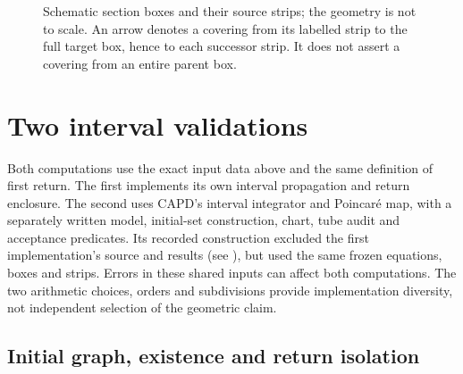 \begin{figure}[ht]
\centering
{}
\caption{Schematic section boxes and their source strips; the geometry is not
to scale. An arrow denotes a covering from its labelled strip to the full
target box, hence to each successor strip. It does not assert a covering
from an entire parent box.}
\label{fig:scheme}
\end{figure}

\section{Two interval validations}\label{sec:computations}

Both computations use the exact input data above and the same definition of
first return. The first implements its own interval propagation and return
enclosure. The second uses CAPD's interval integrator and Poincar\'e map,
with a separately written model, initial-set construction, chart, tube audit
and acceptance predicates. Its recorded construction excluded the first
implementation's source and results (see ),
but used the same frozen equations, boxes and strips. Errors in these shared inputs can affect both computations.
The two arithmetic choices, orders and subdivisions provide implementation
diversity, not independent selection of the geometric claim.

\subsection{Initial graph, existence and return isolation}

